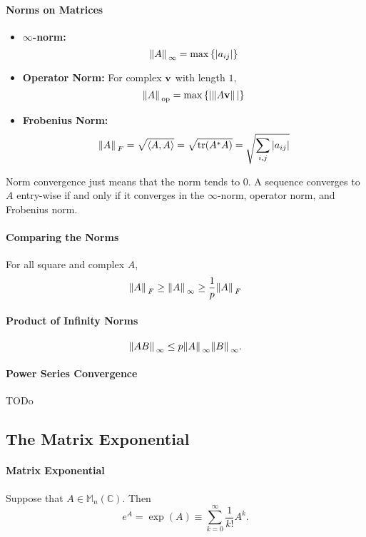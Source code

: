 \paragraph{Norms on Matrices}
\begin{itemize}
    \item \textbf{\( \infty \)-norm:} \[
        \norm*{A}_{\infty} = \max\left\{ \abs{a_{ij}} \right\}
    \]
    \item \textbf{Operator Norm:} For complex \( \mathbf{v} \) with length \( 1 \), \[
        \norm*{A}_{\text{op}} = \max\left\{ \abs{\norm*{A \mathbf{v}}} \right\}
    \]
    \item \textbf{Frobenius Norm:} \[
        \norm*{A}_{F} = \sqrt{\innerprod{A}{A}} = \sqrt{\trace (A^* A)} = \sqrt{\sum_{i, j} |a_{ij}|}
    \]
\end{itemize}

Norm convergence just means that the norm tends to \( 0 \).
A sequence converges to \( A \) entry-wise if and only if it converges
in the \( \infty \)-norm, operator norm, and Frobenius norm.

\paragraph{Comparing the Norms}
For all square and complex \( A \), \[
    \norm*{A}_{F} \geq
    \norm*{A}_{\infty} \geq
    \frac{1}{p} \norm*{A}_{F}
\]

\paragraph{Product of Infinity Norms}
\[
    \norm*{AB}_{\infty} \leq p \norm*{A}_{\infty} \norm*{B}_{\infty}
.\]

\paragraph{Power Series Convergence}
TODo

\subsection{The Matrix Exponential}

\paragraph{Matrix Exponential}
Suppose that \( A \in \mathbb{M}_n (\mathbb{C}) \).
Then \[
    e^A = \exp(A) \equiv \sum_{k = 0}^{\infty} \frac{1}{k!} A^k
.\]

